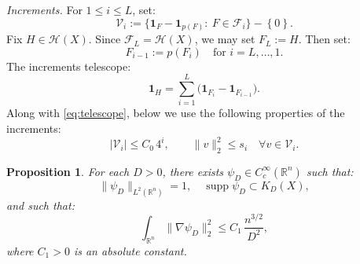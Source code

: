 \documentclass[12pt,reqno]{amsart}
\def\le{\leqslant}
\def\le{\leqslant}
\newtheorem{proposition}[theorem]{Proposition}
\theoremstyle{remark}
\numberwithin{equation}{section}
\newcommand{\one}{\mathbf{1}}
\def \R {\mathbb{R}}
\begin{document}
\emph{Increments.} For \(1\le i\le L\), set:
\[
\mathcal V_i:=\bigl\{\one_F-\one_{p(F)}:\ F\in\mathcal F_i\bigr\} - \left\{0\right\}.
\]
Fix \(H\in\mathcal H(X)\). Since \(\mathcal F_L=\mathcal H(X)\), we may set \(F_L:=H\). Then set:
\[
F_{i-1}:=p(F_i)\quad 
\text{for \(i = L, \ldots, 1\).}
\]
The increments telescope:
\begin{equation}\label{eq:telescope}
\one_H=\sum_{i=1}^L\bigl(\one_{F_i}-\one_{F_{i-1}}\bigr).
\end{equation}
Along with \eqref{eq:telescope}, below we use the following properties of the increments:
\begin{equation}\label{eq:increments}
|\mathcal V_i|\le C_0\,4^i,\qquad
\|v\|_2^2\le s_i\quad \forall v\in\mathcal V_i.
\end{equation}
\begin{proposition}\label{prop:halfplanes}
For each \(D > 0\), there 
exists \(\psi_D\in C_c^\infty(\R^n)\) such that:
\[
\|\psi_D\|_{L^2(\R^n)}=1,\quad
\operatorname{supp}\psi_D\subset K_{D}(X),
\]
and such that:
\begin{equation}\label{eq:halfplane-energy}
\int_{\R^n}\|\nabla\psi_D\|_2^2\le C_1\,\frac{n^{3/2}}{D^2},
\end{equation}
where \(C_1 > 0\) is an absolute constant.
\end{proposition}
\end{document}
